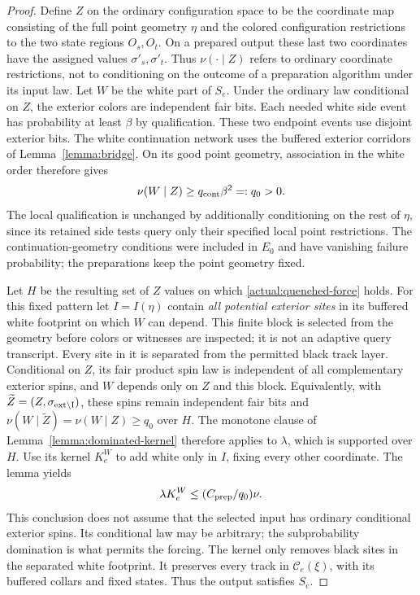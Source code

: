 \begin{proof}
Define $Z$ on the ordinary configuration space to be the coordinate
map consisting of the full point geometry $\eta$ and the colored
configuration restrictions to the two state regions $O_s,O_t$.
On a prepared output these last two coordinates have the assigned
values $\sigma'_s,\sigma'_t$. Thus $\nu(\cdot\mid Z)$ refers to
ordinary coordinate restrictions, not to conditioning on the outcome
of a preparation algorithm under its input law. Let $W$ be the white
part of $S_e$. Under the ordinary law conditional on $Z$, the exterior
colors are independent fair bits. Each needed white side event has probability at least
$\beta$ by qualification.  These two endpoint events use disjoint
exterior bits.  The white continuation network uses the buffered
exterior corridors of Lemma~\ref{lemma:bridge}.  On its good point
geometry, association in the white order therefore gives
\begin{equation}\label{actual:quenched-force}
                  \nu(W\mid Z)\ge q_{\rm cont}\beta^2=:q_0>0.
\end{equation}
The local qualification is unchanged by additionally conditioning on
the rest of $\eta$, since its retained side tests query only their
specified local point restrictions.  The continuation-geometry conditions
were included in $E_0$ and have vanishing failure probability; the
preparations keep the point geometry fixed.

Let $H$ be the resulting set of $Z$ values on which
\eqref{actual:quenched-force} holds. For this fixed pattern let
$I=I(\eta)$ contain \emph{all potential exterior sites} in its
buffered white footprint on which $W$ can depend. This finite block
is selected from the geometry before colors or witnesses are inspected;
it is not an adaptive query transcript. Every site in it is separated
from the permitted black track layer. Conditional on $Z$, its fair
product spin law is independent of all complementary exterior spins,
and $W$ depends only on $Z$ and this block. Equivalently, with
$\widetilde Z=(Z,\sigma_{\rm ext\setminus I})$, these spins remain
independent fair bits and
$\nu(W\mid\widetilde Z)=\nu(W\mid Z)\ge q_0$ over $H$.
The monotone clause of Lemma~\ref{lemma:dominated-kernel} therefore
applies to $\lambda$, which is supported over $H$. Use its kernel
$K_e^W$ to add white only in $I$, fixing every other
coordinate. The lemma yields
\[
                 \lambda K_e^W\le(C_{\rm prep}/q_0)\nu.
\]
This conclusion does not assume that the selected input has ordinary
conditional exterior spins.  Its conditional law may be arbitrary;
the subprobability domination is what permits the forcing.  The
kernel only removes black sites in the separated white footprint.
It preserves every track in $\mathscr C_e(\xi)$, with its buffered
collars and fixed states.  Thus the output satisfies $S_e$.


\end{proof}

